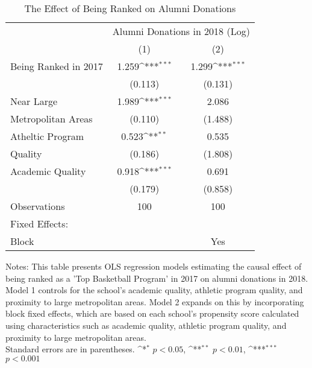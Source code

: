 \begin{table}[htbp]\centering
\def\sym#1{\ifmmode^{#1}\else\(^{#1}\)\fi}
\caption{\label{tab:assignment3} The Effect of Being Ranked on Alumni Donations}
\begin{tabular*}{\hsize}{@{\hskip\tabcolsep\extracolsep\fill}l*{2}{c}}
\hline\hline
                    &\multicolumn{2}{c}{Alumni Donations in 2018 (Log)}\\
                    &\multicolumn{1}{c}{(1)}         &\multicolumn{1}{c}{(2)}         \\
\hline
Being Ranked in 2017&       1.259\sym{***}&       1.299\sym{***}\\
                    &     (0.113)         &     (0.131)         \\
[1em]
Near Large          &       1.989\sym{***}&       2.086         \\
Metropolitan Areas  &     (0.110)         &     (1.488)         \\
[1em]
Atheltic Program    &       0.523\sym{**} &       0.535         \\
Quality             &     (0.186)         &     (1.808)         \\
[1em]
Academic Quality    &       0.918\sym{***}&       0.691         \\
                    &     (0.179)         &     (0.858)         \\
\hline
Observations        &         100         &         100         \\
Fixed Effects:      &                     &                     \\
Block               &                     &         Yes         \\
\hline\hline

\end{tabular*}
\vspace{3mm}
{\parbox{4.8in}{\footnotesize Notes: This table presents OLS regression models estimating the causal effect of being ranked as a 'Top Basketball Program' in 2017 on alumni donations in 2018. Model 1 controls for the school's academic quality, athletic program quality, and proximity to large metropolitan areas. Model 2 expands on this by incorporating block fixed effects, which are based on each school's propensity score calculated using characteristics such as academic quality, athletic program quality, and proximity to large metropolitan areas.\\Standard errors are in parentheses. \sym{*} \(p<0.05\), \sym{**} \(p<0.01\), \sym{***} \(p<0.001\)
}}
\end{table}
